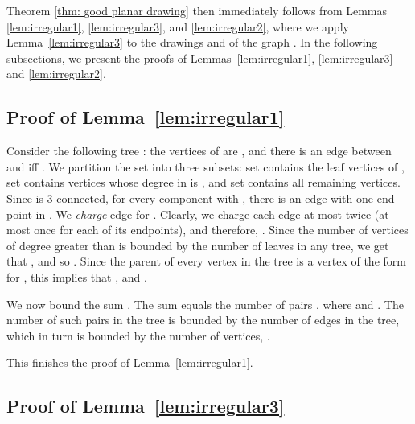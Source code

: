 \documentclass[twoside,leqno,twocolumn]{article}
\begin{document}
Theorem \ref{thm: good planar drawing} then immediately follows from Lemmas \ref{lem:irregular1}, \ref{lem:irregular3}, and \ref{lem:irregular2}, where we apply Lemma~\ref{lem:irregular3} to the drawings  and  of the graph .
In the following subsections, we present the proofs of Lemmas~\ref{lem:irregular1}, \ref{lem:irregular3} and \ref{lem:irregular2}.

\subsection{Proof of Lemma~\ref{lem:irregular1}}\label{subsec:lemma1}
Consider the following tree : the vertices of  are , and there is an edge between  and  iff .
We partition the set  into three subsets: set  contains the leaf vertices of , set  contains vertices whose degree in  is , and set  contains all remaining vertices.
Since  is 3-connected, for every component  with , there is an edge  with 
one end-point in . We \textit{charge} edge  for . 
Clearly, we charge each edge at most twice (at most once for each of its endpoints), and
therefore, . Since the number of vertices of degree greater than  is bounded by the number of leaves in any tree, we get that , and so .  Since the parent of every vertex  in the tree is a vertex of the form  for , this implies that , and .

We now bound the sum . The sum equals the number of pairs , where  and . The number of such pairs in the tree  is bounded by the number of edges in the tree, which in turn is bounded by the number of vertices, .
\iffalse
Denote the number of two connected
components in  by . Then  has  vertices, and, therefore,
 edges. On the other hand, there are  components
that have degree at least  in . Thus  has at least 
edges. Since every 1-separator separates at least two connected components,
the number of edges is at least .
We get that 
 and
. Therefore, 
 and . So .

Since every edge in  is incident to a vertex from  in ,
. The sum  equals
the number of pairs , where  is a connected component of  and 
, which in turn equals the number of edges in , which is less than .
\fi
This finishes the proof of Lemma~\ref{lem:irregular1}.


\subsection{Proof of Lemma~\ref{lem:irregular3}}\label{subsec:lemma2}
\label{sec:irregular-vertices-edges}
\end{document}
